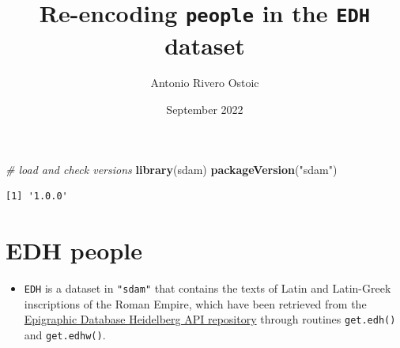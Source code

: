 \documentclass[a4paper,11pt]{memoir}
\title{Re-encoding \texttt{people} in the \texttt{EDH} dataset}
\author{Antonio Rivero Ostoic}
\date{September 2022}
\newenvironment{Shaded}{\begin{snugshade}}{\end{snugshade}}
\newcommand{\CommentTok}[1]{\textcolor[rgb]{0.56,0.35,0.01}{\textit{#1}}}
\newcommand{\DataTypeTok}[1]{\textcolor[rgb]{0.13,0.29,0.53}{#1}}
\newcommand{\KeywordTok}[1]{\textcolor[rgb]{0.13,0.29,0.53}{\textbf{#1}}}
\newcommand{\NormalTok}[1]{#1}
\newcommand{\OperatorTok}[1]{\textcolor[rgb]{0.81,0.36,0.00}{\textbf{#1}}}
\newcommand{\StringTok}[1]{\textcolor[rgb]{0.31,0.60,0.02}{#1}}
\providecommand{\tightlist}{%
  \setlength{\itemsep}{0pt}\setlength{\parskip}{0pt}}
\begin{document}
\maketitle

%   
%   

\begin{Shaded}
\begin{Highlighting}[]
\CommentTok{# load and check versions}
\KeywordTok{library}\NormalTok{(sdam)}
\KeywordTok{packageVersion}\NormalTok{(}\StringTok{"sdam"}\NormalTok{)}
\end{Highlighting}
\end{Shaded}

\begin{verbatim}
[1] '1.0.0'
\end{verbatim}

\hypertarget{edh-people}{%
\section{EDH people}\label{edh-people}}

\begin{itemize}
\tightlist
\item
  \texttt{EDH} is a dataset in \texttt{"sdam"} that contains the texts
  of Latin and Latin-Greek inscriptions of the Roman Empire, which have
  been retrieved from the
  \href{https://edh-www.adw.uni-heidelberg.de/data/api}{Epigraphic
  Database Heidelberg API repository} through routines
  \texttt{get.edh()} and \texttt{get.edhw()}.
\end{itemize}
\end{document}

